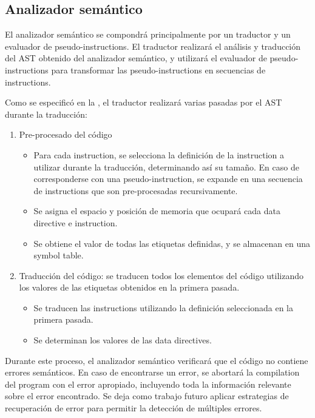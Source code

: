 \subsection{Analizador semántico}\label{subsec:semantic-analyzer}

El analizador semántico se compondrá principalmente por un traductor y un
evaluador de \glspl{pseudo-instruction}. El traductor realizará el análisis y
traducción del \gls{AST} obtenido del analizador semántico, y utilizará el
evaluador de \glspl{pseudo-instruction} para transformar las
\glspl{pseudo-instruction} en secuencias de \glspl{instruction}.

Como se especificó en la , el traductor realizará varias
pasadas por el \gls{AST} durante la traducción:

\begin{enumerate}
    \item Pre-procesado del código
    \begin{itemize}
        \item Para cada \gls{instruction}, se selecciona la definición de la
        \gls{instruction} a utilizar durante la traducción, determinando así su
        tamaño. En caso de corresponderse con una \gls{pseudo-instruction}, se
        expande en una secuencia de \glspl{instruction} que son pre-procesadas
        recursivamente.
        \item Se asigna el espacio y posición de memoria que ocupará cada
        \gls{data directive} e \gls{instruction}.
        \item Se obtiene el valor de todas las etiquetas definidas,
        y se almacenan en una \gls{symbol table}.
    \end{itemize}
    \item Traducción del código: se traducen todos los elementos del código
    utilizando los valores de las etiquetas obtenidos en la primera pasada.
    \begin{itemize}
        \item Se traducen las \glspl{instruction} utilizando la definición
        seleccionada en la primera pasada.
        \item Se determinan los valores de las \glspl{data directive}.
    \end{itemize}
\end{enumerate}

Durante este proceso, el analizador semántico verificará que el código no
contiene errores semánticos. En caso de encontrarse un error, se abortará la
\gls{compilation} del \gls{program} con el error apropiado, incluyendo toda la
información relevante sobre el error encontrado. Se deja como trabajo futuro
aplicar estrategias de recuperación de error para permitir la detección de
múltiples errores.
